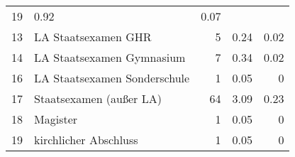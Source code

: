 \begin{longtable}{lXrrr}
       \num{19} &
       \num[round-mode=places,round-precision=2]{0,92} &
         \num[round-mode=places,round-precision=2]{0,07} \\

     13 &
     \multicolumn{1}{X}{ LA Staatsexamen GHR   } &


       \num{5} &
       \num[round-mode=places,round-precision=2]{0,24} &
         \num[round-mode=places,round-precision=2]{0,02} \\

     14 &
     \multicolumn{1}{X}{ LA Staatsexamen Gymnasium   } &


       \num{7} &
       \num[round-mode=places,round-precision=2]{0,34} &
         \num[round-mode=places,round-precision=2]{0,02} \\

     16 &
     \multicolumn{1}{X}{ LA Staatsexamen Sonderschule   } &


       \num{1} &
       \num[round-mode=places,round-precision=2]{0,05} &
         \num[round-mode=places,round-precision=2]{0} \\

     17 &
     \multicolumn{1}{X}{ Staatsexamen (außer LA)   } &


       \num{64} &
       \num[round-mode=places,round-precision=2]{3,09} &
         \num[round-mode=places,round-precision=2]{0,23} \\

     18 &
     \multicolumn{1}{X}{ Magister   } &


       \num{1} &
       \num[round-mode=places,round-precision=2]{0,05} &
         \num[round-mode=places,round-precision=2]{0} \\

     19 &
     \multicolumn{1}{X}{ kirchlicher Abschluss   } &


       \num{1} &
       \num[round-mode=places,round-precision=2]{0,05} &
         \num[round-mode=places,round-precision=2]{0} \\


\end{longtable}
